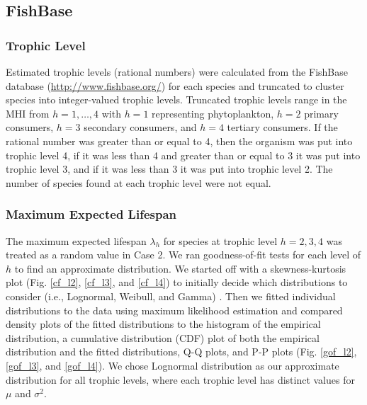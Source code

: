 \documentclass[oneside,12pt,final]{sty/ucthesis-CA2012}
\let\cite\citep                             %
\begin{document}
\begin{mainmatter}
\subsection{FishBase}
\subsubsection{Trophic Level}
Estimated trophic levels (rational numbers) were calculated from the FishBase database (\url{http://www.fishbase.org/}) for each species and truncated to cluster species into integer-valued trophic levels. Truncated trophic levels range in the MHI from $h=1,\dots,4$ with $h=1$ representing phytoplankton, $h=2$ primary consumers, $h=3$ secondary consumers, and $h=4$ tertiary consumers. If the rational number was greater than or equal to 4, then the organism was put into trophic level 4, if it was less than 4 and greater than or equal to 3 it was put into trophic level 3, and if it was less than 3 it was put into trophic level 2. The number of species found at each trophic level were not equal.

\subsubsection{Maximum Expected Lifespan}
The maximum expected lifespan $\lambda_h$ for species at trophic level $h = 2, 3, 4$ was treated as a random value in Case 2. We ran goodness-of-fit tests for each level of $h$ to find an approximate distribution. We started off with a skewness-kurtosis plot (Fig. \ref{cf_l2}, \ref{cf_l3}, and \ref{cf_l4}) to initially decide which distributions to consider (i.e., Lognormal, Weibull, and Gamma) \cite{fitdistrplus}. Then we fitted individual distributions to the data using maximum likelihood estimation and compared density plots of the fitted distributions to the histogram of the empirical distribution, a cumulative distribution (CDF) plot of both the empirical distribution and the fitted distributions, Q-Q plots, and P-P plots (Fig. \ref{gof_l2}, \ref{gof_l3}, and \ref{gof_l4}).  We chose Lognormal distribution as our approximate distribution for all trophic levels, where each trophic level has distinct values for $\mu$ and $\sigma^2$. 


\end{mainmatter}
\end{document}

